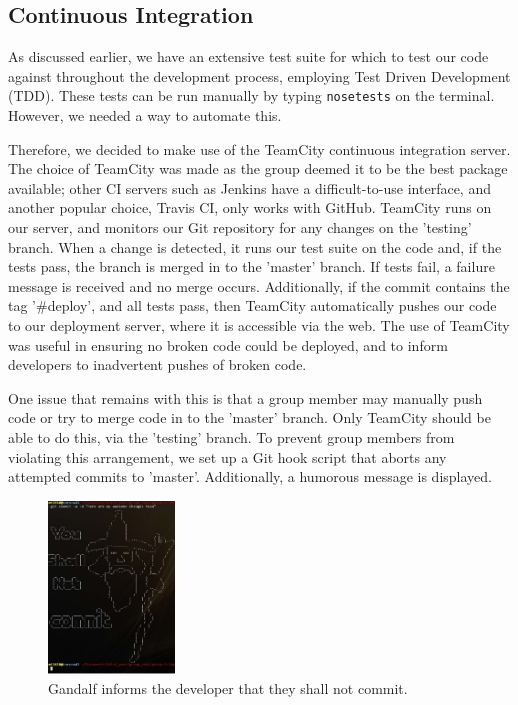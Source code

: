 \documentclass[a4paper, 11pt]{article}
\begin{document}
  \subsection{Continuous Integration}

    As discussed earlier, we have an extensive test suite for which to test our
    code against throughout the development process, employing Test Driven
    Development (TDD). These tests can be run manually by typing
    \texttt{nosetests} on the terminal. However, we needed a way to automate
    this.

    Therefore, we decided to make use of the TeamCity \cite{teamcity}
    continuous integration server. The choice of TeamCity was made as the group
    deemed it to be the best package available; other CI servers such as
    Jenkins have a difficult-to-use interface, and another popular choice,
    Travis CI, only works with GitHub. TeamCity runs on our server,
    and monitors our Git repository for any changes on the 'testing' branch.
    When a change is detected, it runs our test suite on the code and, if the
    tests pass, the branch is merged in to the 'master' branch. If tests fail,
    a failure message is received and no merge occurs. Additionally, if the
    commit contains the tag '\#deploy', and all tests pass, then TeamCity 
    automatically pushes our code to our deployment server, where it is 
    accessible via the web. The use of TeamCity was useful in ensuring no
    broken code could be deployed, and to inform developers to inadvertent
    pushes of broken code.

    One issue that remains with this is that a group member may manually push
    code or try to merge code in to the 'master' branch. Only TeamCity should
    be able to do this, via the 'testing' branch. To prevent group members from
    violating this arrangement, we set up a Git hook script that aborts any
    attempted commits to 'master'. Additionally, a humorous message is
    displayed.

    \begin{figure}[H]
      \centering
      \includegraphics[width=0.3\textwidth]{images/gandalf.jpg}
      \caption{Gandalf informs the developer that they shall not commit.}
    \end{figure}
\end{document}
